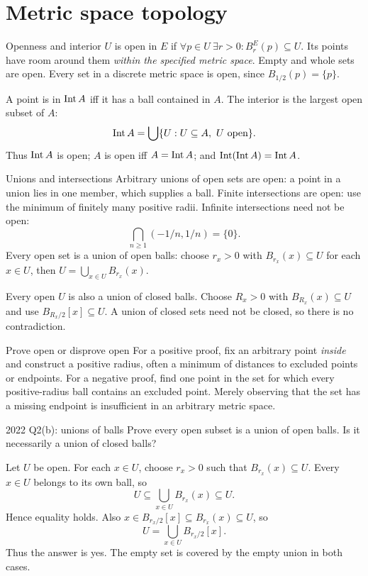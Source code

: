 \clearpage
\setcounter{section}{3}
\section{Metric space topology}

\begin{note}{Openness and interior}
$U$ is open in $E$ if $\forall p\in U\ \exists r>0:B_r^E(p)\subseteq U$. Its points have room around them \emph{within the specified metric space}. Empty and whole sets are open. Every set in a discrete metric space is open, since $B_{1/2}(p)=\{p\}$.

A point is in $\operatorname{Int} A$ iff it has a ball contained in $A$. The interior is the largest open subset of $A$:
\[\operatorname{Int} A=\bigcup\{U:U\subseteq A,\ U\text{ open}\}.\]
Thus $\operatorname{Int} A$ is open; $A$ is open iff $A=\operatorname{Int} A$; and $\operatorname{Int}(\operatorname{Int} A)=\operatorname{Int} A$.
\end{note}
\begin{note}{Unions and intersections}
Arbitrary unions of open sets are open: a point in a union lies in one member, which supplies a ball. Finite intersections are open: use the minimum of finitely many positive radii. Infinite intersections need not be open:
\[\bigcap_{n\ge1}(-1/n,1/n)=\{0\}.\]
Every open set is a union of open balls: choose $r_x>0$ with $B_{r_x}(x)\subseteq U$ for each $x\in U$, then $U=\bigcup_{x\in U}B_{r_x}(x)$.

Every open $U$ is also a union of closed balls. Choose $R_x>0$ with $B_{R_x}(x)\subseteq U$ and use $B_{R_x/2}[x]\subseteq U$. A union of closed sets need not be closed, so there is no contradiction.
\end{note}
\begin{method}{Prove open or disprove open}
For a positive proof, fix an arbitrary point \emph{inside} and construct a positive radius, often a minimum of distances to excluded points or endpoints. For a negative proof, find one point in the set for which every positive-radius ball contains an excluded point. Merely observing that the set has a missing endpoint is insufficient in an arbitrary metric space.
\end{method}
\begin{exam}{2022 Q2(b): unions of balls}
Prove every open subset is a union of open balls. Is it necessarily a union of closed balls?
\end{exam}
\begin{answer}
Let $U$ be open. For each $x\in U$, choose $r_x>0$ such that $B_{r_x}(x)\subseteq U$. Every $x\in U$ belongs to its own ball, so
\[U\subseteq\bigcup_{x\in U}B_{r_x}(x)\subseteq U.\]
Hence equality holds. Also $x\in B_{r_x/2}[x]\subseteq B_{r_x}(x)\subseteq U$, so
\[U=\bigcup_{x\in U}B_{r_x/2}[x].\]
Thus the answer is yes. The empty set is covered by the empty union in both cases.
\end{answer}

